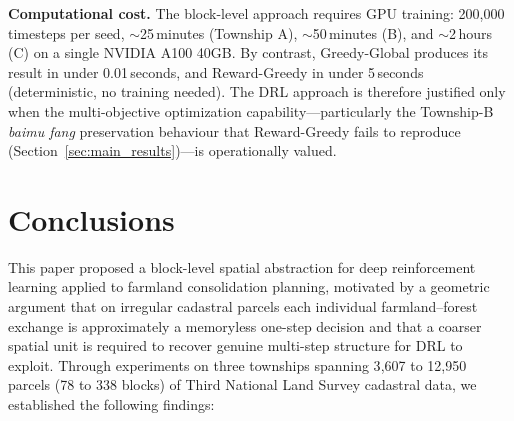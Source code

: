 \documentclass[preprint,12pt]{elsarticle}
\begin{document}
\textbf{Computational cost.} The block-level approach requires GPU training: 200{,}000 timesteps per seed, $\sim$25\,minutes (Township A), $\sim$50\,minutes (B), and $\sim$2\,hours (C) on a single NVIDIA A100 40GB. By contrast, Greedy-Global produces its result in under 0.01\,seconds, and Reward-Greedy in under 5\,seconds (deterministic, no training needed). The DRL approach is therefore justified only when the multi-objective optimization capability---particularly the Township-B \textit{baimu fang} preservation behaviour that Reward-Greedy fails to reproduce (Section~\ref{sec:main_results})---is operationally valued.


\section{Conclusions}
\label{sec:conclusions}

This paper proposed a block-level spatial abstraction for deep reinforcement learning applied to farmland consolidation planning, motivated by a geometric argument that on irregular cadastral parcels each individual farmland--forest exchange is approximately a memoryless one-step decision and that a coarser spatial unit is required to recover genuine multi-step structure for DRL to exploit. Through experiments on three townships spanning 3{,}607 to 12{,}950 parcels (78 to 338 blocks) of Third National Land Survey cadastral data, we established the following findings:
\end{document}
